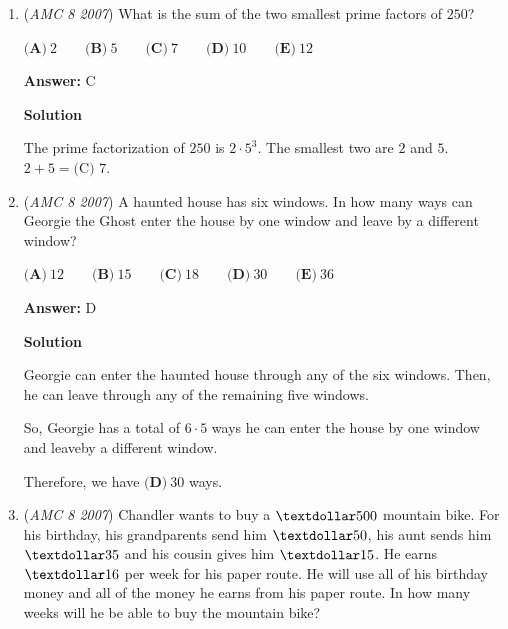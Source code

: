 \begin{enumerate}
 \textbf{Answer: }E



\textbf{Solution}

The answer is $\dfrac{\text{number of students who preferred spaghetti}}{\text{number of students who preferred manicotti}}$

 So,

 $\frac{250}{100}$ 

 Simplify,

 $\frac{5}{2}$ 

 The answer is $\boxed{\textbf{(E)}\ \dfrac{5}{2}}$



	\item (\textit{AMC 8 2007}) What is the sum of the two smallest prime factors of $250$?


 $\textbf{(A)}\ 2 \qquad\textbf{(B)}\ 5 \qquad\textbf{(C)}\ 7 \qquad\textbf{(D)}\ 10 \qquad\textbf{(E)}\ 12$

 \textbf{Answer: }C



\textbf{Solution}

The prime factorization of $250$ is $2 \cdot 5^3$. The smallest two are $2$ and $5$. $2+5 = \boxed{\text{(C) }7}$.

 


	\item (\textit{AMC 8 2007}) A haunted house has six windows. In how many ways can
Georgie the Ghost enter the house by one window and leave
by a different window?


 $\textbf{(A)}\ 12 \qquad\textbf{(B)}\ 15 \qquad\textbf{(C)}\ 18 \qquad\textbf{(D)}\ 30 \qquad\textbf{(E)}\ 36$

 \textbf{Answer: }D



\textbf{Solution}

Georgie can enter the haunted house through any of the six windows. Then, he can leave through any of the remaining five windows.

 So, Georgie has a total of $6 \cdot 5$ ways he can enter the house by one window and leaveby a different window.

 Therefore, we have $\boxed{\textbf{(D)}\ 30}$ ways.

 


	\item (\textit{AMC 8 2007}) Chandler wants to buy a $\textdollar 500$ mountain bike. For his birthday, his grandparents
send him $\textdollar 50$, his aunt sends him $\textdollar 35$ and his cousin gives him $\textdollar 15$. He earns
$\textdollar 16$ per week for his paper route. He will use all of his birthday money and all
of the money he earns from his paper route. In how many weeks will he be able
to buy the mountain bike?



\end{enumerate}
